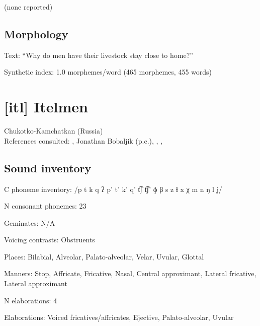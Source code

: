 {(none reported)
\subsection*{Morphology}

\begin{appendixdesc}

\item[Text:] “Why do men have their livestock stay close to home?” \citep[525--530]{Gerner2013}

\item[Synthetic index:] 1.0 morphemes/word (465 morphemes, 455 words)
\end{appendixdesc}
\newpage\section*{[itl] Itelmen}  %
Chukotko-Kamchatkan (Russia)\medskip\\
References consulted: \citet{Bobaljik2006}, Jonathan Bobaljik (p.c.), \citet{GeorgVolodin1999}, \citet{Volodin1976}, \citet{VolodinZhukova1968}
\subsection*{Sound inventory}
\begin{appendixdesc}

\item[C phoneme inventory:] /p t k q ʔ p’ t’ k’ q’ t͡ʃ t͡ʃ’ ɸ β s z ɬ x χ m n ŋ l j/

\item[N consonant phonemes:] 23

\item[Geminates:] N/A

\item[Voicing contrasts:] Obstruents

\item[Places:] Bilabial, Alveolar, Palato-alveolar, Velar, Uvular, Glottal

\item[Manners:] Stop, Affricate, Fricative, Nasal, Central approximant, Lateral fricative, Lateral approximant

\item[N elaborations:] 4

\item[Elaborations:] Voiced fricatives/affricates, Ejective, Palato-alveolar, Uvular


\end{appendixdesc}}
